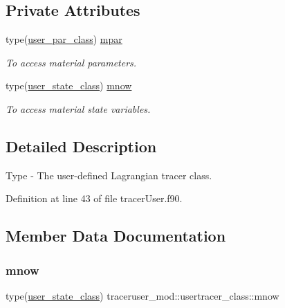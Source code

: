 \subsection*{Private Attributes}
\begin{DoxyCompactItemize}
\item 
type(\mbox{\hyperlink{structtraceruser__mod_1_1user__par__class}{user\+\_\+par\+\_\+class}}) \mbox{\hyperlink{structtraceruser__mod_1_1usertracer__class_a59203a4d0541f8d28381d7bc7c68ca15}{mpar}}
\begin{DoxyCompactList}\small\item\em To access material parameters. \end{DoxyCompactList}\item 
type(\mbox{\hyperlink{structtraceruser__mod_1_1user__state__class}{user\+\_\+state\+\_\+class}}) \mbox{\hyperlink{structtraceruser__mod_1_1usertracer__class_ac965d542bdc803f2b9da8e3c1f10012e}{mnow}}
\begin{DoxyCompactList}\small\item\em To access material state variables. \end{DoxyCompactList}\end{DoxyCompactItemize}


\subsection{Detailed Description}
Type -\/ The user-\/defined Lagrangian tracer class. 

Definition at line 43 of file tracer\+User.\+f90.



\subsection{Member Data Documentation}
\mbox{\label{structtraceruser__mod_1_1usertracer__class_ac965d542bdc803f2b9da8e3c1f10012e}} 
\subsubsection{\texorpdfstring{mnow}{mnow}}
{\footnotesize\ttfamily type(\mbox{\hyperlink{structtraceruser__mod_1_1user__state__class}{user\+\_\+state\+\_\+class}}) traceruser\+\_\+mod\+::usertracer\+\_\+class\+::mnow\hspace{0.3cm}{\ttfamily [private]}}



